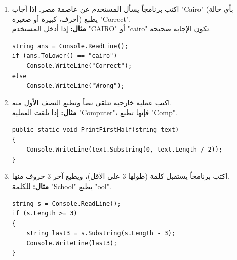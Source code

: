\documentclass[14pt]{extarticle}
\begin{document}
\begin{enumerate}[itemsep=2em]
    \item
    اكتب برنامجاً يسأل المستخدم عن عاصمة مصر.
    إذا أجاب \textenglish{"Cairo"} (بأي حالة أحرف، كبيرة أو صغيرة) يطبع \textenglish{"Correct"}. \\
    \textbf{مثال:} إذا أدخل المستخدم \textenglish{"CAIRO"} أو \textenglish{"cairo"} تكون الإجابة صحيحة.
    \ifwithsols
    \begin{boxSolution}
    \begin{english}
    \begin{verbatim}
string ans = Console.ReadLine();
if (ans.ToLower() == "cairo")
    Console.WriteLine("Correct");
else
    Console.WriteLine("Wrong");
    \end{verbatim}
    \end{english}
    \end{boxSolution}
    \fi

    \item
    اكتب عملية خارجية تتلقى نصاً وتطبع النصف الأول منه. \\
    \textbf{مثال:} إذا تلقت العملية \textenglish{"Computer"}، فإنها تطبع \textenglish{"Comp"}.
    \ifwithsols
    \begin{boxSolution}
    \begin{english}
    \begin{verbatim}
public static void PrintFirstHalf(string text)
{
    Console.WriteLine(text.Substring(0, text.Length / 2));
}
    \end{verbatim}
    \end{english}
    \end{boxSolution}
    \clearpage
    \fi

    \item
    اكتب برنامجاً يستقبل كلمة (طولها 3 على الأقل)، ويطبع آخر 3 حروف منها. \\
    \textbf{مثال:} للكلمة \textenglish{"School"} يطبع \textenglish{"ool"}.
    \ifwithsols
    \begin{boxSolution}
    \begin{english}
    \begin{verbatim}
string s = Console.ReadLine();
if (s.Length >= 3)
{
    string last3 = s.Substring(s.Length - 3);
    Console.WriteLine(last3);
}
    \end{verbatim}
    \end{english}
    \end{boxSolution}
    \fi


\end{enumerate}
\end{document}
